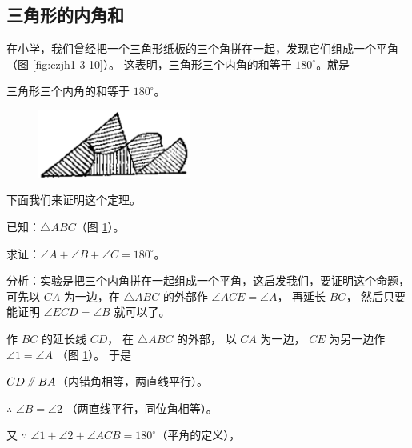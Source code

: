 \subsection{三角形的内角和}\label{subsec:czjh1-3-3}

在小学，我们曾经把一个三角形纸板的三个角拼在一起，发现它们组成一个平角（图 \ref{fig:czjh1-3-10}）。
这表明，三角形三个内角的和等于 $180^\circ$。就是

\begin{dingli}[三角形内角和定理]
    三角形三个内角的和等于 $180^\circ$。
\end{dingli}

\begin{figure}[htbp]
    \centering
    \begin{minipage}[b]{7cm}
        \centering
        \includegraphics[width=5cm]{../pic/czjh1-ch3-10.png}
        \caption{}\label{fig:czjh1-3-10}
    \end{minipage}
    \qquad
    \begin{minipage}[b]{7cm}
        \centering
        
        \caption{}\label{fig:czjh1-3-11}
    \end{minipage}
\end{figure}

下面我们来证明这个定理。

已知：$\triangle ABC$（图 \ref{fig:czjh1-3-11}）。

求证：$\angle A + \angle B + \angle C = 180^\circ$。

分析：实验是把三个内角拼在一起组成一个平角，这启发我们，要证明这个命题，
可先以 $CA$ 为一边，在 $\triangle ABC$ 的外部作 $\angle ACE = \angle A$，
再延长 $BC$， 然后只要能证明 $\angle ECD = \angle B$ 就可以了。

\zhengming 作 $BC$ 的延长线 $CD$， 在 $\triangle ABC$ 的外部，
以 $CA$ 为一边， $CE$ 为另一边作 $\angle 1 = \angle A$ （图 \ref{fig:czjh1-3-11}）。 于是

\hspace*{2em} $CD \pingxing BA$（内错角相等，两直线平行）。

$\therefore$ \quad $\angle B = \angle 2$ （两直线平行，同位角相等）。

又 $\because$ $\angle 1 + \angle 2 + \angle ACB = 180^\circ$（平角的定义），

